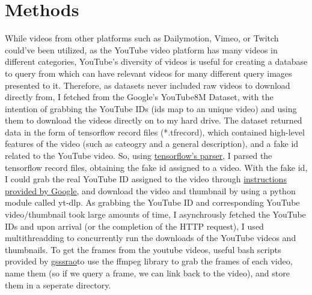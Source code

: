 \documentclass[10pt,twocolumn]{article}
\begin{document}

\section {Methods}

While videos from other platforms such as Dailymotion, Vimeo, or Twitch could've been utilized, as the YouTube video platform has many videos in different categories, YouTube's diversity of videos is useful for creating a database to query from which can have relevant videos for many different query images presented to it. Therefore, as datasets never included raw videos to download directly from, I fetched from the Google's YouTube8M Dataset, with the intention of grabbing the YouTube IDs (ids map to an unique video) and using them to download the videos directly on to my hard drive. The dataset returned data in the form of tensorflow record files (*.tfrecord), which contained high-level features of the video (such as cateogry and a general description), and a fake id related to the YouTube video. So, using \href{https://www.tensorflow.org/api_docs/python/tf/io}{tensorflow's parser}, I parsed the tensorflow record files, obtaining the fake id assigned to a video. With the fake id, I could grab the real YouTube ID assigned to the video through \href{https://research.google.com/youtube8m/video_id_conversion.html}{instructions provided by Google}, and download the video and thumbnail by using a python module called yt-dlp. As grabbing the YouTube ID and corresponding YouTube video/thumbnail took large amounts of time, I asynchrously fetched the YouTube IDs and upon arrival (or the completion of the HTTP request), I used multithreadding to concurrently run the downloads of the YouTube videos and thumbnails. To get the frames from the youtube videos, useful bash scripts provided by \href{https://github.com/gsssrao/youtube-8m-videos-frames}{gsssrao}to use the ffmpeg library to grab the frames of each video, name them (so if we query a frame, we can link back to the video), and store them in a seperate directory.
\end{document}
